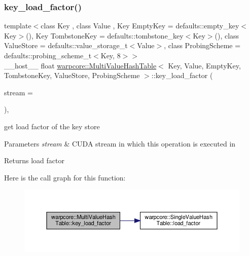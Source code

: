 \subsubsection{\texorpdfstring{key\+\_\+load\+\_\+factor()}{key\_load\_factor()}}
{\footnotesize\ttfamily template$<$class Key , class Value , Key Empty\+Key = defaults\+::empty\+\_\+key$<$\+Key$>$(), Key Tombstone\+Key = defaults\+::tombstone\+\_\+key$<$\+Key$>$(), class Value\+Store  = defaults\+::value\+\_\+storage\+\_\+t$<$\+Value$>$, class Probing\+Scheme  = defaults\+::probing\+\_\+scheme\+\_\+t$<$\+Key, 8$>$$>$ \\
\+\_\+\+\_\+host\+\_\+\+\_\+ float \hyperlink{classwarpcore_1_1MultiValueHashTable}{warpcore\+::\+Multi\+Value\+Hash\+Table}$<$ Key, Value, Empty\+Key, Tombstone\+Key, Value\+Store, Probing\+Scheme $>$\+::key\+\_\+load\+\_\+factor (\begin{DoxyParamCaption}\item[{cuda\+Stream\+\_\+t}]{stream = {} }\end{DoxyParamCaption})\hspace{0.3cm}{\ttfamily [inline]}, {\ttfamily [noexcept]}}



get load factor of the key store 


\begin{DoxyParams}{Parameters}
{\em stream} & C\+U\+DA stream in which this operation is executed in \\
\hline
\end{DoxyParams}
\begin{DoxyReturn}{Returns}
load factor 
\end{DoxyReturn}
Here is the call graph for this function\+:
\nopagebreak
\begin{figure}[H]
\begin{center}
\leavevmode
\includegraphics[width=350pt]{classwarpcore_1_1MultiValueHashTable_a3c84877469284ea0edfe5a0b62abe765_cgraph}
\end{center}
\end{figure}
\mbox{\label{classwarpcore_1_1MultiValueHashTable_a3e494c09904b4ea2c68c623641a391f3}} 
